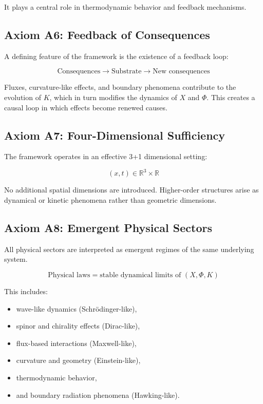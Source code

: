 \documentclass[11pt]{article}
\begin{document}
It plays a central role in thermodynamic behavior and feedback mechanisms.

\subsection{Axiom A6: Feedback of Consequences}

A defining feature of the framework is the existence of a feedback loop:

\begin{equation}
\text{Consequences} \rightarrow \text{Substrate} \rightarrow \text{New consequences}
\end{equation}

Fluxes, curvature-like effects, and boundary phenomena contribute to the evolution of $K$, which in turn modifies the dynamics of $X$ and $\Phi$. This creates a causal loop in which effects become renewed causes.

\subsection{Axiom A7: Four-Dimensional Sufficiency}

The framework operates in an effective 3+1 dimensional setting:

\begin{equation}
(x,t) \in \mathbb{R}^3 \times \mathbb{R}
\end{equation}

No additional spatial dimensions are introduced. Higher-order structures arise as dynamical or kinetic phenomena rather than geometric dimensions.

\subsection{Axiom A8: Emergent Physical Sectors}

All physical sectors are interpreted as emergent regimes of the same underlying system.

\begin{equation}
\text{Physical laws} = \text{stable dynamical limits of } (X, \Phi, K)
\end{equation}

This includes:
\begin{itemize}
\item wave-like dynamics (Schrödinger-like),
\item spinor and chirality effects (Dirac-like),
\item flux-based interactions (Maxwell-like),
\item curvature and geometry (Einstein-like),
\item thermodynamic behavior,
\item and boundary radiation phenomena (Hawking-like).
\end{itemize}
\end{document}
